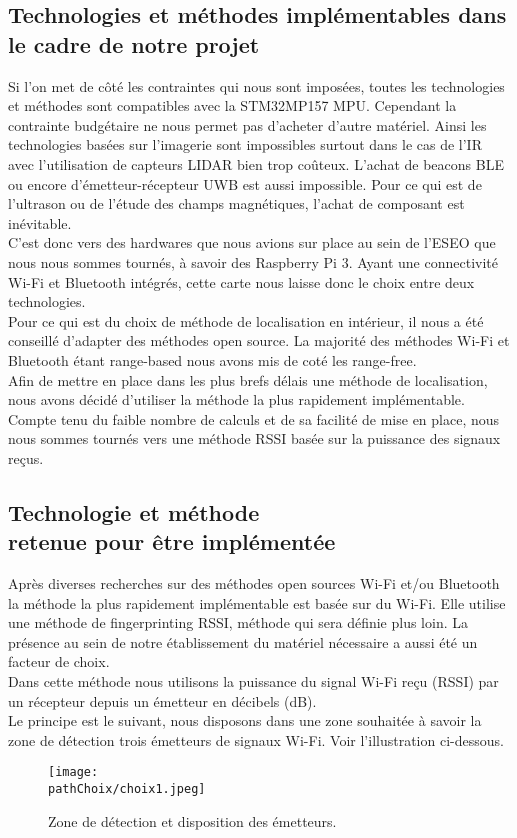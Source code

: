 \subsection{Technologies et méthodes implémentables dans le cadre de notre projet}
Si l'on met de côté les contraintes qui nous sont imposées, toutes les technologies et méthodes sont compatibles avec la STM32MP157 MPU. Cependant la contrainte budgétaire ne nous permet pas d'acheter d'autre matériel.
Ainsi les technologies basées sur l'imagerie sont impossibles surtout dans le cas de l'IR avec l'utilisation de capteurs LIDAR bien trop coûteux. L'achat de beacons BLE ou encore d'émetteur-récepteur UWB est aussi impossible. Pour ce qui est de l'ultrason ou de l'étude des champs magnétiques, l'achat de composant est inévitable. 
\medskip
\\
C'est donc vers des hardwares que nous avions sur place au sein de l'ESEO que nous nous sommes tournés, à savoir des Raspberry Pi 3. Ayant une connectivité Wi-Fi et Bluetooth intégrés, cette carte nous laisse donc le choix entre deux technologies.
\\
\newpage
Pour ce qui est du choix de méthode de localisation en intérieur, il nous a été conseillé d'adapter des méthodes open source. La majorité des méthodes Wi-Fi et Bluetooth étant range-based nous avons mis de coté les range-free.
\medskip
\\
Afin de mettre en place dans les plus brefs délais une méthode de localisation, nous avons décidé d'utiliser la méthode la plus rapidement implémentable. Compte tenu du faible nombre de calculs et de sa facilité de mise en place, nous nous sommes tournés vers une méthode RSSI basée sur la puissance des signaux reçus.


\subsection{Technologie et méthode \\ retenue pour être implémentée}


Après diverses recherches sur des méthodes open sources Wi-Fi et/ou Bluetooth la méthode la plus rapidement implémentable est basée sur du Wi-Fi. Elle utilise une méthode de fingerprinting RSSI, méthode qui sera définie plus loin.
La présence au sein de notre établissement du matériel nécessaire a aussi été un facteur de choix.
\medskip
\\
Dans cette méthode nous utilisons la puissance du signal Wi-Fi reçu (RSSI) par un récepteur depuis un émetteur en décibels (dB). 
\medskip
\\
Le principe est le suivant, nous disposons dans une zone souhaitée à savoir la zone de détection trois émetteurs de signaux Wi-Fi. Voir l'illustration ci-dessous.
\begin{figure}[H]
\centering
\texttt{[image: \\pathChoix/choix1.jpeg]}
\caption{Zone de détection et disposition des émetteurs.}
\end{figure}

